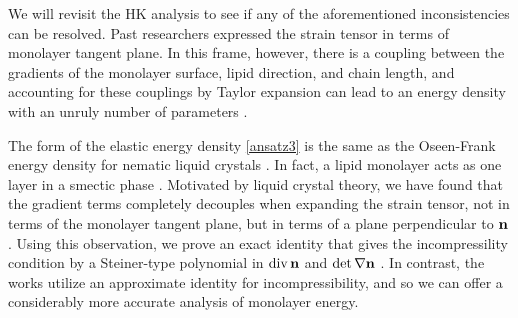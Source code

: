   We will revisit the HK analysis to see if any of the aforementioned inconsistencies can be resolved.
  Past researchers expressed the strain tensor in terms of monolayer tangent plane.   
  In this frame, however, there is a coupling between the gradients of the monolayer surface, lipid direction, and chain length,
  and accounting for these couplings by Taylor expansion  
  can lead to an energy density with an unruly number of parameters \cite{PhysRevE.102.042406}.

The form of the elastic energy density \eqref{ansatz3} is the same as
  the Oseen-Frank energy density for nematic liquid crystals \cite{ANDRIENKO2018520,Tran7106,Helfrich73}.   In fact,  
  a lipid monolayer acts as one layer in a smectic  phase \cite{REYESMATEO1995978,Rangamani20140463,PhysRevLett.113.248102}. 
  Motivated by liquid crystal theory, we have found that the gradient terms completely decouples when 
  expanding the strain tensor, not in terms of the monolayer tangent plane, but in terms of a plane perpendicular to ${\bf n}$. 
  Using this observation, we prove an exact identity 
  that gives the incompressility condition by a Steiner-type polynomial in $\operatorname{div} {\bf n}$ and $\det \nabla {\bf n}$ \cite{Fe59}.
  In contrast, the works \cite{TerziDeserno17, PhysRevE.102.042406, Hamm2000, C9SM02079A} utilize an
  approximate identity for incompressibility, and so we can offer a considerably more accurate analysis of monolayer energy.
  

